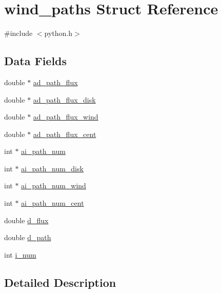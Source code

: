 \hypertarget{structwind__paths}{}\section{wind\+\_\+paths Struct Reference}
\label{structwind__paths}


{\ttfamily \#include $<$python.\+h$>$}

\subsection*{Data Fields}
\begin{DoxyCompactItemize}
\item 
double $\ast$ \hyperlink{structwind__paths_a1370c8bf3ce0046cf5df146163242ca7}{ad\+\_\+path\+\_\+flux}
\item 
double $\ast$ \hyperlink{structwind__paths_a0a5d8e1d1f2c6ac1ef12546861a42944}{ad\+\_\+path\+\_\+flux\+\_\+disk}
\item 
double $\ast$ \hyperlink{structwind__paths_a4febc3700f5712b104b005e27921fbb9}{ad\+\_\+path\+\_\+flux\+\_\+wind}
\item 
double $\ast$ \hyperlink{structwind__paths_abf38c990c4bd01de98ed20efc146b668}{ad\+\_\+path\+\_\+flux\+\_\+cent}
\item 
int $\ast$ \hyperlink{structwind__paths_ad9480733a091275ed02feb9937319984}{ai\+\_\+path\+\_\+num}
\item 
int $\ast$ \hyperlink{structwind__paths_ae982a83bc3af8b04244b0381768cb7a5}{ai\+\_\+path\+\_\+num\+\_\+disk}
\item 
int $\ast$ \hyperlink{structwind__paths_affbbb54b31990833657a147d163bb4c3}{ai\+\_\+path\+\_\+num\+\_\+wind}
\item 
int $\ast$ \hyperlink{structwind__paths_af48b5567dbea692d3db304ca81b99ee3}{ai\+\_\+path\+\_\+num\+\_\+cent}
\item 
double \hyperlink{structwind__paths_a88bf2b63a99884a3541f0f33dd931668}{d\+\_\+flux}
\item 
double \hyperlink{structwind__paths_ab64de9566a8772c7072cd638373ca585}{d\+\_\+path}
\item 
int \hyperlink{structwind__paths_adbd726e6d16ac18e5293af5aab92be0e}{i\+\_\+num}
\end{DoxyCompactItemize}


\subsection{Detailed Description}


